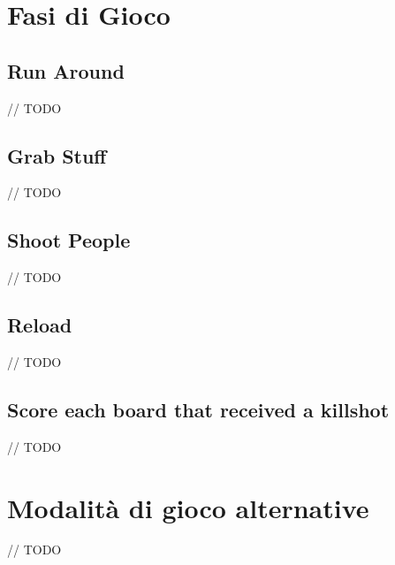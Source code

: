 \documentclass[a4paper, 12pt]{article}
\begin{document}
\newpage

\section{Fasi di Gioco}
	\subsection{Run Around}
		// TODO
	\subsection{Grab Stuff}
		// TODO
	\subsection{Shoot People}
		// TODO
	\subsection{Reload}
		// TODO
	\subsection{Score each board that received a killshot}
		// TODO
		
\section{Modalità di gioco alternative}
	// TODO
\end{document}

